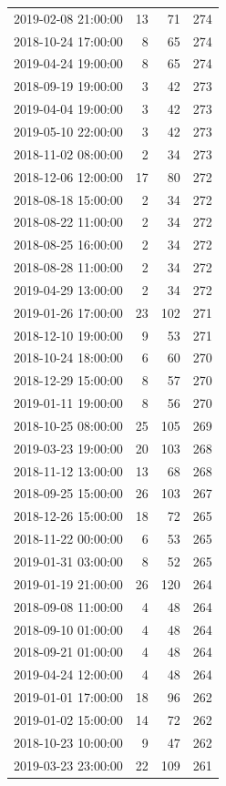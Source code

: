 \begin{tabular}{lrrr}
2019-02-08 21:00:00 & 13 & 71 & 274 \\
2018-10-24 17:00:00 & 8 & 65 & 274 \\
2019-04-24 19:00:00 & 8 & 65 & 274 \\
2018-09-19 19:00:00 & 3 & 42 & 273 \\
2019-04-04 19:00:00 & 3 & 42 & 273 \\
2019-05-10 22:00:00 & 3 & 42 & 273 \\
2018-11-02 08:00:00 & 2 & 34 & 273 \\
2018-12-06 12:00:00 & 17 & 80 & 272 \\
2018-08-18 15:00:00 & 2 & 34 & 272 \\
2018-08-22 11:00:00 & 2 & 34 & 272 \\
2018-08-25 16:00:00 & 2 & 34 & 272 \\
2018-08-28 11:00:00 & 2 & 34 & 272 \\
2019-04-29 13:00:00 & 2 & 34 & 272 \\
2019-01-26 17:00:00 & 23 & 102 & 271 \\
2018-12-10 19:00:00 & 9 & 53 & 271 \\
2018-10-24 18:00:00 & 6 & 60 & 270 \\
2018-12-29 15:00:00 & 8 & 57 & 270 \\
2019-01-11 19:00:00 & 8 & 56 & 270 \\
2018-10-25 08:00:00 & 25 & 105 & 269 \\
2019-03-23 19:00:00 & 20 & 103 & 268 \\
2018-11-12 13:00:00 & 13 & 68 & 268 \\
2018-09-25 15:00:00 & 26 & 103 & 267 \\
2018-12-26 15:00:00 & 18 & 72 & 265 \\
2018-11-22 00:00:00 & 6 & 53 & 265 \\
2019-01-31 03:00:00 & 8 & 52 & 265 \\
2019-01-19 21:00:00 & 26 & 120 & 264 \\
2018-09-08 11:00:00 & 4 & 48 & 264 \\
2018-09-10 01:00:00 & 4 & 48 & 264 \\
2018-09-21 01:00:00 & 4 & 48 & 264 \\
2019-04-24 12:00:00 & 4 & 48 & 264 \\
2019-01-01 17:00:00 & 18 & 96 & 262 \\
2019-01-02 15:00:00 & 14 & 72 & 262 \\
2018-10-23 10:00:00 & 9 & 47 & 262 \\
2019-03-23 23:00:00 & 22 & 109 & 261 \\

\end{tabular}
